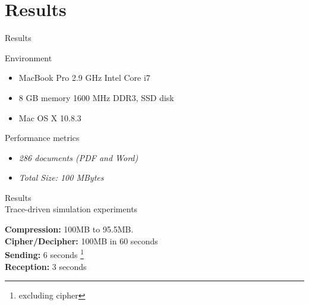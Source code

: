 
\section{Results}
\begin{frame}{Results}

\begin{block}{Environment}
\begin{itemize}
\item MacBook Pro 2.9 GHz Intel Core i7
\item 8 GB memory 1600 MHz DDR3, SSD disk
\item Mac OS X 10.8.3
\end{itemize}
\end{block}	

\begin{block}{Performance metrics}
\begin{itemize}
\item \textit{286 documents (PDF and Word)}
\item \textit{Total Size: 100 MBytes}
\end{itemize}
\end{block}	

	
\end{frame}

\begin{frame}{Results \\ \small Trace-driven simulation experiments}

\textbf{Compression: }  100MB to 95.5MB. \\
\textbf{Cipher/Decipher: }  100MB in 60 seconds\\ 
\vspace{0.5cm}
\textbf{Sending:} 6 seconds \footnote{excluding cipher}\\
\textbf{Reception:} 3 seconds \\


\end{frame}



